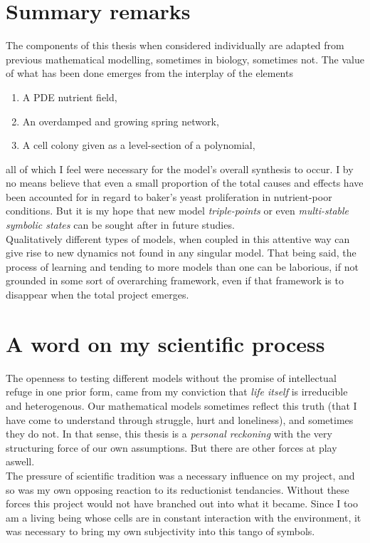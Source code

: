 \conclusions

\section{Summary remarks}
The components of this thesis when considered individually
are adapted from previous mathematical 
modelling, sometimes in biology, sometimes not. The value of 
what has been done emerges from the interplay of the elements
\begin{enumerate}
    \item A PDE nutrient field,
    \item An overdamped and growing spring network,
    \item A cell colony given as a level-section of a polynomial,
\end{enumerate}
all of which I feel were necessary for the model's overall 
synthesis to occur. I by no means believe 
that even a small proportion of the total causes and effects
have been accounted for in regard to baker's yeast proliferation 
in nutrient-poor conditions. But it is my hope 
that new model \textit{triple-points} or even \textit{multi-stable symbolic states} 
can be sought after in future 
studies.
\\

Qualitatively different types of models, when coupled
in this attentive way can give rise to new dynamics not found in 
any singular model. That being said, 
the process of learning and tending to more models than one can be
laborious, if not grounded in some sort of overarching 
framework, even if that framework is to disappear 
when the total project emerges.
\\

\section{A word on my scientific process}
The openness to testing different models without 
the promise of intellectual refuge in one prior form, came 
from my conviction that \textit{life itself} is irreducible
and heterogenous. Our mathematical models sometimes reflect 
this truth (that I have come to understand through struggle, 
hurt and loneliness), and sometimes 
they do not. In that sense, this thesis is a 
\textit{personal reckoning} with the very structuring 
force of our own assumptions. But there are other 
forces at play aswell.
\\

The pressure of scientific tradition was a necessary 
influence on my project, and so was 
my own opposing reaction to its reductionist tendancies.
Without these forces this project would not have 
branched out into what it became. Since 
I too am a living being whose cells 
are in constant interaction with the environment, 
it was necessary to bring my own subjectivity
into this tango of symbols.
\\

